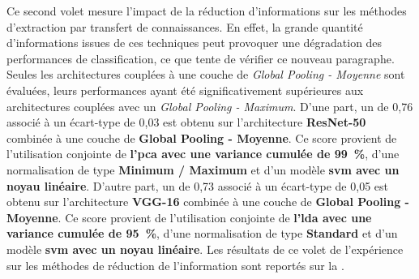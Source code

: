 Ce second volet mesure l'impact de la réduction d'informations sur les méthodes d'extraction par transfert de connaissances. En effet, la grande quantité d'informations issues de ces techniques peut provoquer une dégradation des performances de classification, ce que tente de vérifier ce nouveau paragraphe. Seules les architectures couplées à une couche de \textit{Global Pooling - Moyenne} sont évaluées, leurs performances ayant été significativement supérieures aux architectures couplées avec un \textit{Global Pooling - Maximum}. D'une part, un \fscore{} de 0,76 associé à un écart-type de 0,03 est obtenu sur l'architecture \textbf{ResNet-50} combinée à une couche de \textbf{Global Pooling - Moyenne}. Ce score provient de l'utilisation conjointe de \textbf{l'\gls{pca} avec une variance cumulée de 99~\%}, d'une normalisation de type \textbf{Minimum / Maximum} et d'un modèle \textbf{\gls{svm} avec un noyau linéaire}. D'autre part, un \fscore{} de 0,73 associé à un écart-type de 0,05 est obtenu sur l'architecture \textbf{VGG-16} combinée à une couche de \textbf{Global Pooling - Moyenne}. Ce score provient de l'utilisation conjointe de \textbf{l'\gls{lda} avec une variance cumulée de 95~\%}, d'une normalisation de type \textbf{Standard} et d'un modèle \textbf{\gls{svm} avec un noyau linéaire}. Les résultats de ce volet de l'expérience sur les méthodes de réduction de l'information sont reportés sur la .\par

